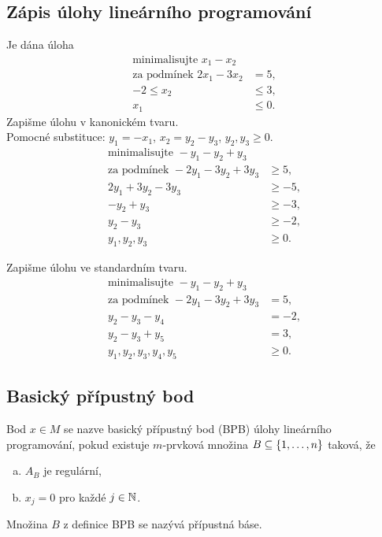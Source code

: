 \subsection{Zápis úlohy lineárního programování}
Je dána úloha
\begin{align*}
    \text{minimalisujte } x_1 - x_2 \\
    \text{za podmínek } 2x_1 - 3x_2 &= 5, \\
    -2 \leq x_2 &\leq 3, \\
    x_1 &\leq 0.
\end{align*}
Zapišme úlohu v kanonickém tvaru.\\
Pomocné substituce: $y_1 = -x_1$, $x_2 = y_2 - y_3$, $y_2, y_3 \geq 0$.
\begin{align*}
    \text{minimalisujte } -y_1-y_2+y_3 \\
    \text{za podmínek } -2y_1 - 3y_2 + 3y_3 &\geq 5, \\
    2y_1 + 3y_2 - 3y_3 &\geq -5, \\
    -y_2 + y_3 &\geq -3, \\
    y_2 - y_3 &\geq -2,\\
    y_1, y_2, y_3 &\geq 0.
\end{align*}

Zapišme úlohu ve standardním tvaru.
\begin{align*}
    \text{minimalisujte } -y_1-y_2+y_3 \\
    \text{za podmínek } -2y_1 - 3y_2 + 3y_3 & = 5, \\
    y_2 - y_3 - y_4 &= -2, \\
    y_2 - y_3 + y_5 &= 3, \\
    y_1, y_2, y_3, y_4, y_5 &\geq 0.
\end{align*}

\subsection{Basický přípustný bod}\label{BPB}
Bod $x \in M$ se nazve basický přípustný bod (BPB) úlohy lineárního programování, pokud existuje $m$-prvková množina
$B \subseteq \left\lbrace 1, \dots, n \right\rbrace$ taková, že
\begin{enumerate}[(a)]
    \item $A_B$ je regulární,
    \item $x_j = 0$ pro každé $j \in \mathbb{N}$.
\end{enumerate}
Množina $B$ z definice BPB se nazývá přípustná báse.

